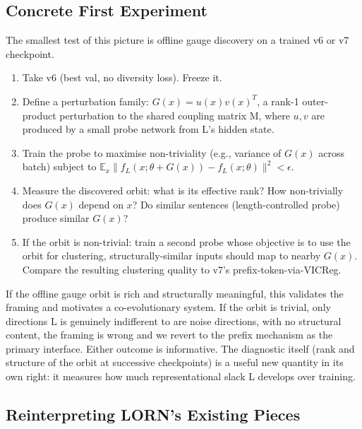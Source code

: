 \documentclass[11pt, a4paper]{article}
\theoremstyle{plain}
\theoremstyle{definition}
\theoremstyle{remark}
\begin{document}
\subsection{Concrete First Experiment}

The smallest test of this picture is offline gauge discovery on a trained v6 or v7 checkpoint.

\begin{enumerate}[nosep]
\item Take v6 (best val, no diversity loss). Freeze it.
\item Define a perturbation family: $G(x) = u(x) v(x)^T$, a rank-1 outer-product perturbation to the shared coupling matrix M, where $u, v$ are produced by a small probe network from L's hidden state.
\item Train the probe to maximise non-triviality (e.g., variance of $G(x)$ across batch) subject to $\mathbb{E}_x \| f_L(x; \theta + G(x)) - f_L(x; \theta) \|^2 < \epsilon$.
\item Measure the discovered orbit: what is its effective rank? How non-trivially does $G(x)$ depend on $x$? Do similar sentences (length-controlled probe) produce similar $G(x)$?
\item If the orbit is non-trivial: train a second probe whose objective is to use the orbit for clustering, structurally-similar inputs should map to nearby $G(x)$. Compare the resulting clustering quality to v7's prefix-token-via-VICReg.
\end{enumerate}

If the offline gauge orbit is rich and structurally meaningful, this validates the framing and motivates a co-evolutionary system.
If the orbit is trivial, only directions L is genuinely indifferent to are noise directions, with no structural content, the framing is wrong and we revert to the prefix mechanism as the primary interface.
Either outcome is informative.
The diagnostic itself (rank and structure of the orbit at successive checkpoints) is a useful new quantity in its own right: it measures how much representational slack L develops over training.

\subsection{Reinterpreting LORN's Existing Pieces}
\end{document}
